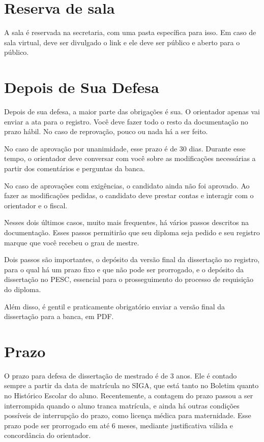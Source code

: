 \section{Reserva de sala}

A sala é reservada na secretaria, com uma pasta específica para isso. Em caso de sala virtual, deve ser divulgado o link e ele deve ser público e aberto para o público. 

\section{Depois de Sua Defesa}

Depois de sua defesa, a maior parte das obrigações é sua. O orientador apenas vai enviar a ata para o registro. Você deve fazer todo o resto da documentação no prazo hábil. No caso de reprovação, pouco ou nada há a ser feito.

No caso de aprovação por unanimidade, esse prazo é de 30 dias. Durante esse tempo, o orientador deve conversar com você sobre as modificações necessárias a partir dos comentários e perguntas da banca.

No caso de aprovações com exigências, o candidato ainda não foi aprovado. Ao fazer as modificações pedidas, o candidato deve prestar contas e interagir com o orientador e o fiscal.

Nesses dois últimos casos, muito mais frequentes, há vários passos descritos na documentação. Esses passos permitirão que seu diploma seja pedido e seu registro marque que você recebeu o grau de mestre.

Dois passos são importantes, o depósito da versão final da dissertação no registro, para o qual há um prazo fixo e que não pode ser prorrogado, e o depósito da dissertação no PESC, essencial para o prosseguimento do processo de requisição do diploma.

Além disso, é gentil e praticamente obrigatório enviar a versão final da dissertação para a banca, em PDF.


\section{Prazo}

O prazo para defesa de dissertação de mestrado é de 3 anos. Ele é contado sempre a partir da data de matrícula no SIGA, que está tanto no Boletim quanto no Histórico Escolar do aluno. Recentemente, a contagem do prazo passou a ser interrompida quando o aluno tranca matrícula, e ainda há outras condições possíveis de interrupção do prazo, como licença médica para maternidade. Esse prazo pode ser prorrogado em até 6 meses, mediante justificativa válida e concordância do orientador.

